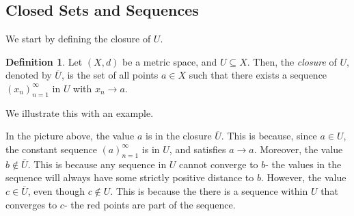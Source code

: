 \documentclass[a4paper, openany]{memoir}
\theoremstyle{definition}
\newtheorem{definition}{Definition}[section]
\theoremstyle{plain}
\begin{document}
\subsection{Closed Sets and Sequences}
We start by defining the closure of $U$.
\begin{definition}
Let $(X, d)$ be a metric space, and $U \subseteq X$. Then, the \emph{closure} of $U$, denoted by $\overline{U}$, is the set of all points $a \in X$ such that there exists a sequence $(x_n)_{n=1}^{\infty}$ in $U$ with $x_n \to a$.
\end{definition}
\noindent We illustrate this with an example.
\begin{figure}[H]
    \centering
\end{figure}
\noindent In the picture above, the value $a$ is in the closure $\overline{U}$. This is because, since $a \in U$, the constant sequence $(a)_{n=1}^{\infty}$ is in $U$, and satisfies $a \to a$. Moreover, the value $b \not\in \overline{U}$. This is because any sequence in $U$ cannot converge to $b$- the values in the sequence will always have some strictly positive distance to $b$. However, the value $c \in \overline{U}$, even though $c \not\in U$. This is because the there is a sequence within $U$ that converges to $c$- the red points are part of the sequence.
\end{document}
